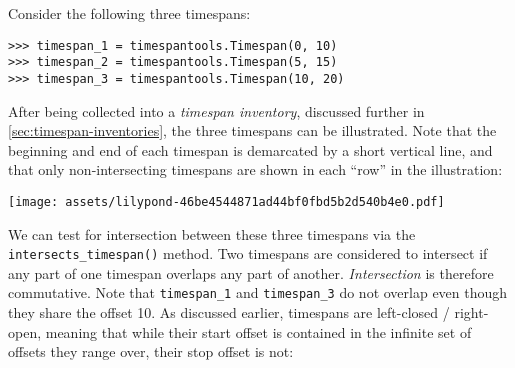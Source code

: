 Consider the following three timespans:

\begin{comment}
<abjad>
timespan_1 = timespantools.Timespan(0, 10)
timespan_2 = timespantools.Timespan(5, 15)
timespan_3 = timespantools.Timespan(10, 20)
</abjad>
\end{comment}

\begin{abjadbookoutput}
\begin{singlespacing}
\vspace{-0.5\baselineskip}
\begin{verbatim}
>>> timespan_1 = timespantools.Timespan(0, 10)
>>> timespan_2 = timespantools.Timespan(5, 15)
>>> timespan_3 = timespantools.Timespan(10, 20)
\end{verbatim}
\end{singlespacing}
\end{abjadbookoutput}

\noindent After being collected into a \emph{timespan inventory}, discussed
further in \autoref{sec:timespan-inventories}, the three timespans can be
illustrated. Note that the beginning and end of each timespan is demarcated by
a short vertical line, and that only non-intersecting timespans are shown in
each \enquote{row} in the illustration:

\begin{comment}
<abjad>[hide=true]
timespan_inventory = timespantools.TimespanInventory([
    timespan_1,
    timespan_2,
    timespan_3,
    ])
show(timespan_inventory)
</abjad>
\end{comment}

\begin{abjadbookoutput}
\begin{singlespacing}
\vspace{-0.5\baselineskip}
\noindent\texttt{[image: assets/lilypond-46be4544871ad44bf0fbd5b2d540b4e0.pdf]}
\end{singlespacing}
\end{abjadbookoutput}

\noindent We can test for intersection between these three timespans via the
\texttt{intersects\_timespan()} method. Two timespans are considered to
intersect if any part of one timespan overlaps any part of another.
\emph{Intersection} is therefore commutative. Note that \texttt{timespan\_1}
and \texttt{timespan\_3} do not overlap even though they share the offset 10.
As discussed earlier, timespans are left-closed / right-open, meaning that
while their start offset is contained in the infinite set of offsets they range
over, their stop offset is not:

